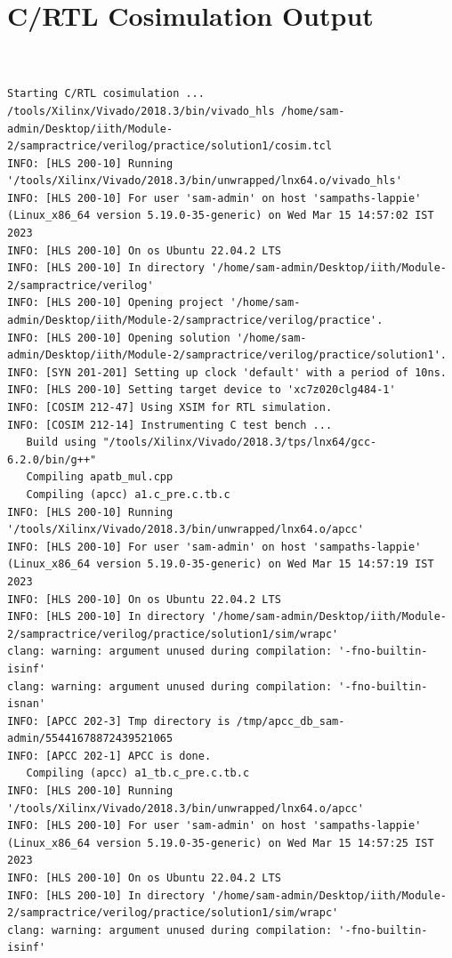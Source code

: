 \documentclass{article}
\begin{document}
\section{C/RTL Cosimulation Output}
\vspace{1cm}
\begin{lstlisting}


Starting C/RTL cosimulation ...
/tools/Xilinx/Vivado/2018.3/bin/vivado_hls /home/sam-admin/Desktop/iith/Module-2/sampractrice/verilog/practice/solution1/cosim.tcl
INFO: [HLS 200-10] Running '/tools/Xilinx/Vivado/2018.3/bin/unwrapped/lnx64.o/vivado_hls'
INFO: [HLS 200-10] For user 'sam-admin' on host 'sampaths-lappie' (Linux_x86_64 version 5.19.0-35-generic) on Wed Mar 15 14:57:02 IST 2023
INFO: [HLS 200-10] On os Ubuntu 22.04.2 LTS
INFO: [HLS 200-10] In directory '/home/sam-admin/Desktop/iith/Module-2/sampractrice/verilog'
INFO: [HLS 200-10] Opening project '/home/sam-admin/Desktop/iith/Module-2/sampractrice/verilog/practice'.
INFO: [HLS 200-10] Opening solution '/home/sam-admin/Desktop/iith/Module-2/sampractrice/verilog/practice/solution1'.
INFO: [SYN 201-201] Setting up clock 'default' with a period of 10ns.
INFO: [HLS 200-10] Setting target device to 'xc7z020clg484-1'
INFO: [COSIM 212-47] Using XSIM for RTL simulation.
INFO: [COSIM 212-14] Instrumenting C test bench ...
   Build using "/tools/Xilinx/Vivado/2018.3/tps/lnx64/gcc-6.2.0/bin/g++"
   Compiling apatb_mul.cpp
   Compiling (apcc) a1.c_pre.c.tb.c
INFO: [HLS 200-10] Running '/tools/Xilinx/Vivado/2018.3/bin/unwrapped/lnx64.o/apcc'
INFO: [HLS 200-10] For user 'sam-admin' on host 'sampaths-lappie' (Linux_x86_64 version 5.19.0-35-generic) on Wed Mar 15 14:57:19 IST 2023
INFO: [HLS 200-10] On os Ubuntu 22.04.2 LTS
INFO: [HLS 200-10] In directory '/home/sam-admin/Desktop/iith/Module-2/sampractrice/verilog/practice/solution1/sim/wrapc'
clang: warning: argument unused during compilation: '-fno-builtin-isinf'
clang: warning: argument unused during compilation: '-fno-builtin-isnan'
INFO: [APCC 202-3] Tmp directory is /tmp/apcc_db_sam-admin/55441678872439521065
INFO: [APCC 202-1] APCC is done.
   Compiling (apcc) a1_tb.c_pre.c.tb.c
INFO: [HLS 200-10] Running '/tools/Xilinx/Vivado/2018.3/bin/unwrapped/lnx64.o/apcc'
INFO: [HLS 200-10] For user 'sam-admin' on host 'sampaths-lappie' (Linux_x86_64 version 5.19.0-35-generic) on Wed Mar 15 14:57:25 IST 2023
INFO: [HLS 200-10] On os Ubuntu 22.04.2 LTS
INFO: [HLS 200-10] In directory '/home/sam-admin/Desktop/iith/Module-2/sampractrice/verilog/practice/solution1/sim/wrapc'
clang: warning: argument unused during compilation: '-fno-builtin-isinf'

\end{lstlisting}
\end{document}
